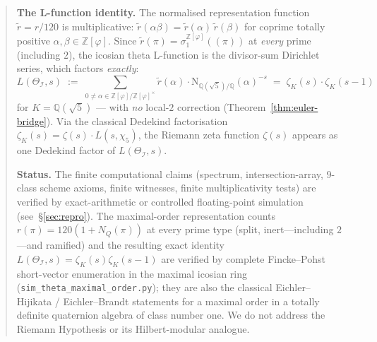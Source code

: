\documentclass[11pt,a4paper]{article}
\theoremstyle{definition}
\theoremstyle{remark}
\newcommand{\Z}{\mathbb{Z}}
\newcommand{\Q}{\mathbb{Q}}
\newcommand{\II}{\mathcal{I}}
\newcommand{\NQ}{\mathrm{N}_{\mathbb{Q}(\sqrt{5})/\mathbb{Q}}}
\newcommand{\Zphi}{\Z[\varphi]}
\begin{document}
\begin{abstract}
\smallskip\noindent\textbf{The L-function identity.}
The normalised representation function $\widetilde r = r/120$ is multiplicative:
$\widetilde r(\alpha\beta) = \widetilde r(\alpha)\,\widetilde r(\beta)$ for coprime
totally positive $\alpha, \beta \in \Zphi$. Since $\widetilde r(\pi) =
\sigma_1^{\Zphi}((\pi))$ at \emph{every} prime (including $2$), the icosian theta
L-function is the divisor-sum Dirichlet series, which factors \emph{exactly}:
\[
  L(\Theta_\II, s) \;:=\; \sum_{0 \neq \alpha \in \Zphi/\Zphi^\times}
  \widetilde r(\alpha)\!\cdot\! \NQ(\alpha)^{-s}
  \;=\; \zeta_K(s)\!\cdot\! \zeta_K(s-1)
\]
for $K = \Q(\sqrt{5})$ --- with \emph{no} local-$2$ correction
(Theorem~\ref{thm:euler-bridge}). Via the classical Dedekind factorisation
$\zeta_K(s) = \zeta(s)\!\cdot\! L(s,\chi_5)$, the Riemann zeta function
$\zeta(s)$ appears as one Dedekind factor of $L(\Theta_\II, s)$.

\smallskip\noindent\textbf{Status.}
The finite computational claims (spectrum, intersection-array, $9$-class
scheme axioms, finite witnesses, finite multiplicativity tests) are
verified by exact-arithmetic or controlled floating-point simulation
(see~\S\ref{sec:repro}). The maximal-order representation counts
$r(\pi)=120(1+N_Q(\pi))$ at every prime type (split, inert---including
$2$---and ramified) and the resulting exact identity
$L(\Theta_\II,s)=\zeta_K(s)\zeta_K(s-1)$ are verified by complete
Fincke--Pohst short-vector enumeration in the maximal icosian ring
(\texttt{sim\_theta\_maximal\_order.py}); they are also the classical
Eichler--Hijikata / Eichler--Brandt statements for a maximal order in a
totally definite quaternion algebra of class number one. We do not address
the Riemann Hypothesis or its Hilbert-modular analogue.
\end{abstract}

\bigskip
\end{document}
